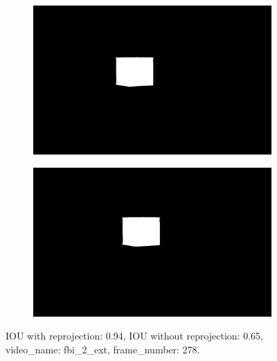 \begin{figure}
\begin{subfigure}[t]{0.19\textwidth}
\end{subfigure}
\begin{subfigure}[t]{0.19\textwidth}
\centering
\includegraphics[scale=0.07]{good_examples/visual_211770_w_np.png}
\end{subfigure}
\begin{subfigure}[t]{0.19\textwidth}
\centering
\includegraphics[scale=0.07]{good_examples/visual_211770_wo_np.png}
\end{subfigure}
\caption{IOU with reprojection: 0.94, IOU without reprojection: 0.65, video\_name: fbi\_2\_ext, frame\_number: 278.}
\end{figure}
